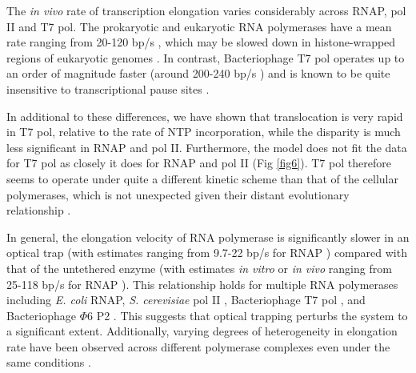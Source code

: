\documentclass[10pt,letterpaper]{article}
\begin{document}
The \textit{ in vivo} rate of transcription elongation varies considerably across  RNAP, pol II and T7 pol. The prokaryotic and eukaryotic RNA polymerases have a mean rate ranging from 20-120 bp/s \cite{iost1992bacteriophage, vogel1994rna, ryals1982temperature, tennyson1995human, darzacq2007vivo, mason2005distinction, kainov2004packaging}, which may be slowed down in histone-wrapped regions of eukaryotic genomes \cite{hodges2009nucleosomal}. In contrast, Bacteriophage T7 pol operates up to an order of magnitude faster (around 200-240 bp/s \cite{iost1992bacteriophage, makarova1995transcribing}) and is known to be quite insensitive to transcriptional pause sites \cite{skinner2004promoter, thomen2008t7}.



In additional to these differences, we have shown that translocation is very rapid in T7 pol, relative to the rate of NTP incorporation, while the disparity is much less significant in RNAP and pol II. Furthermore, the model does not fit the data for T7 pol as closely it does for RNAP and pol II (Fig \ref{fig6}).  T7 pol therefore seems to operate under quite a different kinetic scheme than that of the cellular polymerases, which is not unexpected given their distant evolutionary relationship \cite{sousa1993crystal}. \par




In general, the elongation velocity of RNA polymerase is significantly slower in an optical trap (with estimates ranging from 9.7-22 bp/s for RNAP \cite{neuman2003ubiquitous, davenport2000single, tolic2004diversity, mejia2015trigger, mejia2008thermal})  compared with that of the untethered enzyme (with estimates \textit{ in vitro} or \textit{ in vivo} ranging from 25-118 bp/s for RNAP \cite{iost1992bacteriophage, vogel1994rna, burns1998combinatorial, kingston1981direct}). This relationship holds for multiple RNA polymerases including \textit{E. coli} RNAP, \textit{S. cerevisiae} pol II \cite{galburt2009single, larson2012trigger, Dangkulwanich2013complete, kireeva2008transient}, Bacteriophage T7 pol \cite{skinner2004promoter, thomen2008t7, iost1992bacteriophage, anand2006transient}, and Bacteriophage $\Phi 6$ P2 \cite{dulin2015elongation, usala1980displacement}. This suggests that optical trapping perturbs the system to a significant extent. Additionally, varying degrees of heterogeneity in elongation rate have been observed across different polymerase complexes even under the same conditions \cite{tolic2004diversity, neuman2003ubiquitous, thomen2008t7}. \par
\end{document}
